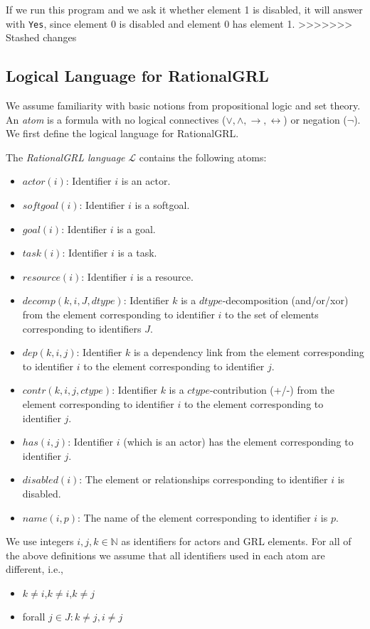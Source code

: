 If we run this program and we ask it whether element 1 is disabled, it will answer with \texttt{Yes}, since element 0 is disabled and element 0 has element 1.
>>>>>>> Stashed changes

\subsection{Logical Language for RationalGRL}
\label{sect:goalmodeling:logicallanguage}

We assume familiarity with basic notions from propositional logic and set theory. An \emph{atom} is a formula with no logical connectives ($\vee, \wedge, \rightarrow, \leftrightarrow$) or negation ($\neg$). We first define the logical language for RationalGRL. 

\begin{definition}
The \emph{RationalGRL language} $\mathcal{L}$ contains the following atoms:
\begin{itemize}
\item $actor(i)$: Identifier $i$ is an actor.
\item $softgoal(i)$: Identifier $i$ is a softgoal.
\item $goal(i)$: Identifier $i$ is a goal.
\item $task(i)$: Identifier $i$ is a task.
\item $resource(i)$: Identifier $i$ is a resource.
\item $decomp(k,i,J,dtype)$: Identifier $k$ is a $dtype$-decomposition (and/or/xor) from the element corresponding to identifier $i$ to the set of elements corresponding to identifiers $J$.
\item $dep(k,i,j)$: Identifier $k$ is a dependency link from the element corresponding to identifier $i$ to the element corresponding to identifier $j$.
\item $contr(k,i,j,ctype)$: Identifier $k$ is a $ctype$-contribution (+/-) from the element corresponding to identifier $i$ to the element corresponding to identifier $j$.
\item $has(i,j)$: Identifier $i$ (which is an actor) has the element corresponding to identifier $j$.
\item $disabled(i)$: The element or relationships corresponding to identifier $i$ is disabled.
\item $name(i,p)$: The name of the element corresponding to identifier $i$ is $p$.
\end{itemize}

We use integers $i,j,k\in\mathbb{N}$ as identifiers for actors and GRL elements. For all of the above definitions we assume that all identifiers used in each atom are different, i.e.,
\begin{itemize}
\item $k\not=i$,$k\not=i$,$k\not=j$
\item forall $j\in J: k\not=j, i\not=j$
\end{itemize}
\end{definition}

